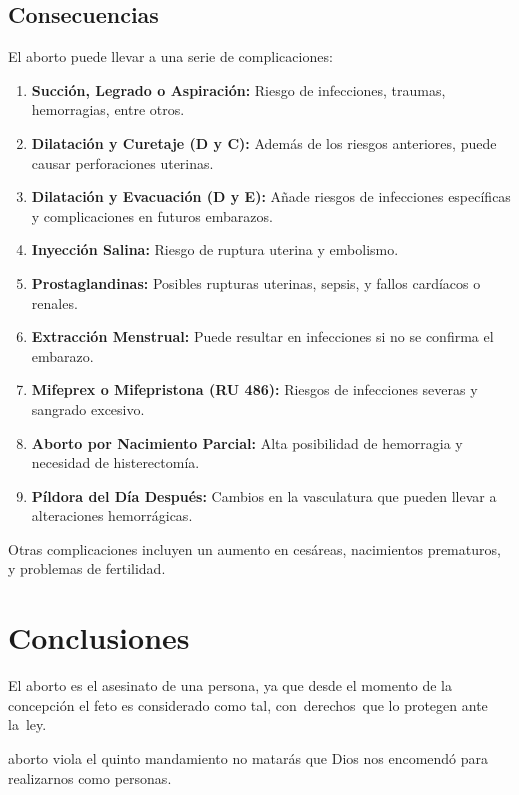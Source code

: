 \documentclass[
  jou,
  floatsintext,
  longtable,
  a4paper,
  nolmodern,
  notxfonts,
  notimes,
  12pt,
  colorlinks=true,linkcolor=blue,citecolor=blue,urlcolor=blue]{apa7}
\providecommand{\tightlist}{%
  \setlength{\itemsep}{0pt}\setlength{\parskip}{0pt}}
\begin{document}
\subsection{Consecuencias}\label{consecuencias}

El aborto puede llevar a una serie de complicaciones:

\begin{enumerate}
\def\labelenumi{\arabic{enumi}.}
\tightlist
\item
  \textbf{Succión, Legrado o Aspiración:} Riesgo de infecciones,
  traumas, hemorragias, entre otros.
\item
  \textbf{Dilatación y Curetaje (D y C):} Además de los riesgos
  anteriores, puede causar perforaciones uterinas.
\item
  \textbf{Dilatación y Evacuación (D y E):} Añade riesgos de infecciones
  específicas y complicaciones en futuros embarazos.
\item
  \textbf{Inyección Salina:} Riesgo de ruptura uterina y embolismo.
\item
  \textbf{Prostaglandinas:} Posibles rupturas uterinas, sepsis, y fallos
  cardíacos o renales.
\item
  \textbf{Extracción Menstrual:} Puede resultar en infecciones si no se
  confirma el embarazo.
\item
  \textbf{Mifeprex o Mifepristona (RU 486):} Riesgos de infecciones
  severas y sangrado excesivo.
\item
  \textbf{Aborto por Nacimiento Parcial:} Alta posibilidad de hemorragia
  y necesidad de histerectomía.
\item
  \textbf{Píldora del Día Después:} Cambios en la vasculatura que pueden
  llevar a alteraciones hemorrágicas.
\end{enumerate}

Otras complicaciones incluyen un aumento en cesáreas, nacimientos
prematuros, y problemas de fertilidad.

\section{Conclusiones}\label{conclusiones}

El aborto es el asesinato de una persona, ya que desde el momento de la
concepción el feto es considerado como tal, con~derechos~que lo protegen
ante la~ley.

aborto viola el quinto mandamiento no matarás que Dios nos encomendó
para realizarnos como personas.
\end{document}
